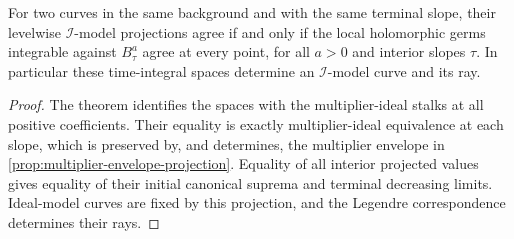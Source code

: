 \begin{corollary}\label{cor:ray-integrals-determine-ideal-projection}
For two curves in the same background and with the same terminal slope, their levelwise $\mathcal I$-model projections agree if and only if the local holomorphic germs integrable against $B^a_\tau$ agree at every point, for all $a>0$ and interior slopes $\tau$. In particular these time-integral spaces determine an $\mathcal I$-model curve and its ray.
\end{corollary}
\begin{proof}
The theorem identifies the spaces with the multiplier-ideal stalks at all positive coefficients. Their equality is exactly multiplier-ideal equivalence at each slope, which is preserved by, and determines, the multiplier envelope in \cref{prop:multiplier-envelope-projection}. Equality of all interior projected values gives equality of their initial canonical suprema and terminal decreasing limits. Ideal-model curves are fixed by this projection, and the Legendre correspondence determines their rays.
\end{proof}
